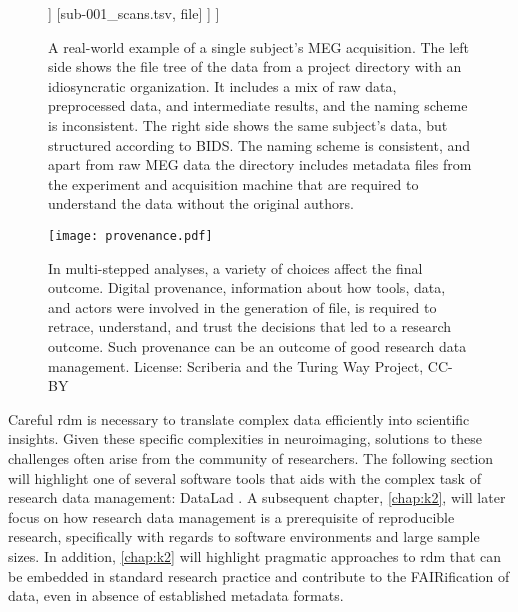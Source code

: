 \begin{figure}
{\begin{minipage}{.49\textwidth}
\begin{forest}
				]
				[sub-001\_scans.tsv, file]
				]
				]
			\end{forest}
		\end{minipage}
	}
	\caption[An example of BIDS]{A real-world example of a single subject's MEG acquisition. The left side shows the file tree of the data from a project directory with an idiosyncratic organization. It includes a mix of raw data, preprocessed data, and intermediate results, and the naming scheme is inconsistent. The right side shows the same subject's data, but structured according to \gls{BIDS}. The naming scheme is consistent, and apart from raw MEG data the directory includes metadata files from the experiment and acquisition machine that are required to understand the data without the original authors.}
	\label{fig:BIDS}
\end{figure}


\begin{figure}
	\centering
	\texttt{[image: provenance.pdf]}
	\caption[Provenance throughout the research process]{In multi-stepped analyses, a variety of choices affect the final outcome. Digital provenance, information about how tools, data, and actors were involved in the generation of file, is required to retrace, understand, and trust the decisions that led to a research outcome. Such provenance can be an outcome of good research data management. License: Scriberia and the Turing Way Project, CC-BY}
	\label{fig:prov1}
\end{figure}



Careful \gls{rdm} is necessary to translate complex data efficiently into scientific insights.
Given these specific complexities in neuroimaging, solutions to these challenges often arise from the community of researchers.
The following section will highlight one of several software tools that aids with the complex task of research data management: DataLad \citep{Halchenko2021}.
A subsequent chapter, \cref{chap:k2}, will later focus on how research data management is a prerequisite of reproducible research, specifically with regards to software environments and large sample sizes.
In addition, \cref{chap:k2} will highlight pragmatic approaches to \gls{rdm} that can be embedded in standard research practice and contribute to the FAIRification of data, even in absence of established metadata formats.



